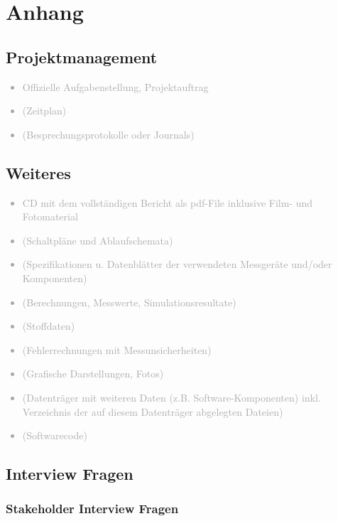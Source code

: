 
\appendix
\chapter{Anhang}
\label{sec:Anhang}

\section{Projektmanagement}\label{projektmanagement}

\textcolor{darkgray}{
  \begin{itemize}
  \item Offizielle Aufgabenstellung, Projektauftrag
  \item (Zeitplan)
  \item (Besprechungsprotokolle oder Journals)
  \end{itemize}
}

\section{Weiteres}
\label{sec:Weiteres}

\textcolor{darkgray}{
  \begin{itemize}
  \item CD mit dem vollständigen Bericht als pdf-File inklusive Film- und Fotomaterial
  \item (Schaltpläne und Ablaufschemata)
  \item (Spezifikationen u. Datenblätter der verwendeten Messgeräte und/oder Komponenten)
  \item (Berechnungen, Messwerte, Simulationsresultate)
  \item (Stoffdaten)
  \item (Fehlerrechnungen mit Messunsicherheiten)
  \item (Grafische Darstellungen, Fotos)
  \item (Datenträger mit weiteren Daten (z.B. Software-Komponenten) inkl. Verzeichnis der auf diesem Datenträger abgelegten Dateien)
  \item (Softwarecode)
  \end{itemize}
}

\section{Interview Fragen}
\subsection{Stakeholder Interview Fragen}
\label{subsec:stakeholderfragen}
